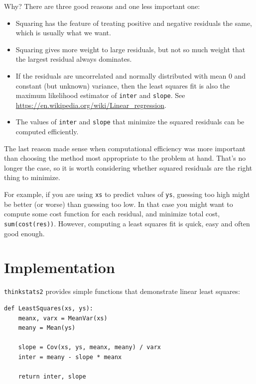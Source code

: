 \documentclass[12pt]{book}
\begin{document}
Why?  There are three good reasons and one less important one:

\begin{itemize}

\item Squaring has the feature of treating positive and
negative residuals the same, which is usually what we want.

\item Squaring gives more weight to large residuals, but not
so much weight that the largest residual always dominates.

\item If the residuals are uncorrelated and normally distributed with
mean 0 and constant (but unknown) variance, then the least squares
fit is also the maximum likelihood estimator of \verb"inter" and
\verb"slope".  See
\url{https://en.wikipedia.org/wiki/Linear_regression}.  

\item The values of \verb"inter" and \verb"slope" that minimize
  the squared residuals can be computed efficiently.

\end{itemize}

The last reason made sense when computational efficiency was more
important than choosing the method most appropriate to the problem
at hand.  That's no longer the case, so it is worth considering
whether squared residuals are the right thing to minimize.

For example, if you are using \verb"xs" to predict values of \verb"ys",
guessing too high might be better (or worse) than guessing too low.
In that case you might want to compute some cost function for each
residual, and minimize total cost, \verb"sum(cost(res))".
However, computing a least squares fit is quick, easy and often good
enough.  


\section{Implementation}

\verb"thinkstats2" provides simple functions that demonstrate
linear least squares:

\begin{verbatim}
def LeastSquares(xs, ys):
    meanx, varx = MeanVar(xs)
    meany = Mean(ys)

    slope = Cov(xs, ys, meanx, meany) / varx
    inter = meany - slope * meanx

    return inter, slope
\end{verbatim}
\end{document}

